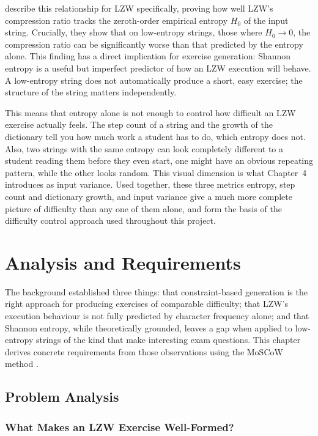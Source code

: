 \documentclass{l4proj}
\begin{document}
\citet{KosarajuManzini99} describe this relationship for LZW specifically, proving how well LZW's compression ratio tracks the zeroth-order empirical entropy $H_0$ of the input string. Crucially, they show that on low-entropy strings, those where $H_0 \rightarrow 0$, the compression ratio can be significantly worse than that predicted by the entropy alone. This finding has a direct implication for exercise generation: Shannon entropy is a useful but imperfect predictor of how an LZW execution will behave. A low-entropy string does not automatically produce a short, easy exercise; the structure of the string matters independently.
 
This means that entropy alone is not enough to control how difficult an LZW exercise actually feels. The step count of a string and the growth of the dictionary tell you how much work a student has to do, which entropy does not. Also, two strings with the same entropy can look completely different to a student reading them before they even start, one might have an obvious repeating pattern, while the other looks random. This visual dimension is what Chapter~4 introduces as input variance. Used together, these three metrics entropy, step count and dictionary growth, and input variance give a much more complete picture of difficulty than any one of them alone, and form the basis of the difficulty control approach used throughout this project.
\chapter{Analysis and Requirements}

The background established three things: that constraint-based generation is the right approach for producing exercises of comparable difficulty; that LZW's execution behaviour is not fully predicted by character frequency alone; and that Shannon entropy, while theoretically grounded, leaves a gap when applied to low-entropy strings of the kind that make interesting exam questions. This chapter derives concrete requirements from those observations using the MoSCoW method \citep{MoSCoW}.

\section{Problem Analysis}

\subsection{What Makes an LZW Exercise Well-Formed?}
\end{document}
